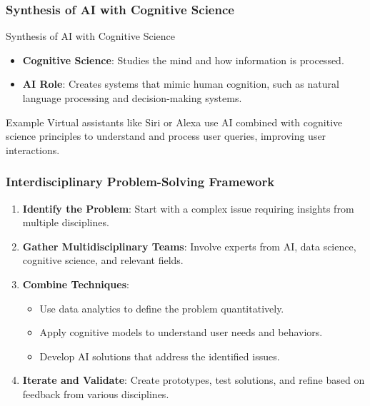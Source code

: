 \documentclass[aspectratio=169]{beamer}
\begin{document}
\begin{frame}[fragile]
    \frametitle{Synthesis of AI with Cognitive Science}
    \begin{block}{Synthesis of AI with Cognitive Science}
        \begin{itemize}
            \item \textbf{Cognitive Science}: Studies the mind and how information is processed.
            \item \textbf{AI Role}: Creates systems that mimic human cognition, such as natural language processing and decision-making systems.
        \end{itemize}
        
        \begin{exampleblock}{Example}
            Virtual assistants like Siri or Alexa use AI combined with cognitive science principles to understand and process user queries, improving user interactions.
        \end{exampleblock}
    \end{block}
\end{frame}

\begin{frame}[fragile]
    \frametitle{Interdisciplinary Problem-Solving Framework}
    \begin{enumerate}
        \item \textbf{Identify the Problem}: Start with a complex issue requiring insights from multiple disciplines.
        \item \textbf{Gather Multidisciplinary Teams}: Involve experts from AI, data science, cognitive science, and relevant fields.
        \item \textbf{Combine Techniques}: 
            \begin{itemize}
                \item Use data analytics to define the problem quantitatively.
                \item Apply cognitive models to understand user needs and behaviors.
                \item Develop AI solutions that address the identified issues.
            \end{itemize}
        \item \textbf{Iterate and Validate}: Create prototypes, test solutions, and refine based on feedback from various disciplines.
    \end{enumerate}
\end{frame}
\end{document}
